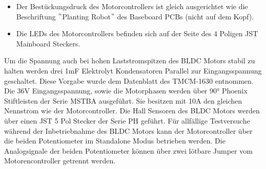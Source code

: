 \begin{itemize}
	\item Der Bestückungsdruck des Motorcontrollers ist gleich ausgerichtet wie die Beschriftung $"$Planting Robot$"$ des Baseboard PCBs (nicht auf dem Kopf).
	\item Die LEDs des Motorcontrollers befinden sich auf der Seite des 4 Poligen JST Mainboard Steckers.
\end{itemize}

Um die Spannung auch bei hohen Laststromspitzen des BLDC Motors stabil zu halten werden drei 1mF Elektrolyt Kondensatoren Parallel zur Eingangsspannung geschaltet. Diese Vorgabe wurde dem Datenblatt des TMCM-1630 entnommen. Die 36V Eingangsspannung, sowie die Motorphasen werden über 90° Phoenix Stiftleisten der Serie MSTBA ausgeführt. Sie besitzen mit 10A den gleichen Nennstrom wie der Motorcontroller. Die Hall Sensoren des BLDC Motors werden über einen JST 5 Pol Stecker der Serie PH geführt. Für allfällige Testversuche während der Inbetriebnahme des BLDC Motors kann der Motorcontroller über die beiden Potentiometer im Standalone Modus betrieben werden. Die Analogsignale der beiden Potentiometer können über zwei lötbare Jumper vom Motorencontroller getrennt werden.
